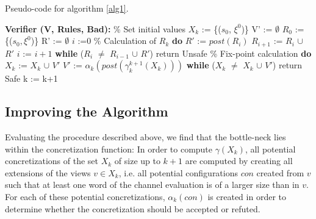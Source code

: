 \begin{algorithm}
  \caption{Pseudo-code for algorithm \ref{alg1}.}
	\label{naive}
  \begin{algorithmic}[1]
    \State \textbf{Verifier (V, Rules, Bad):}
	\State \% Set initial values
	\State $X_k$ := \{($s_0$, $\xi^0$)\}
	\State V' := $\emptyset$
	\State $R_0$ := \{($s_0, \xi^0$)\}
	\State R' := $\emptyset$
	\State $i$ :=$0$
	\State
	\State \% Calculation of $R_k$
	\State \textbf{do}
        \State \hspace{10pt} $R'$ := $post(R_i)$
	\State \hspace{10pt} $R_{i+1}$ := $R_i$ $\cup$ $R'$
	\State \hspace{10pt} $i$ := $i+1$
	\State \textbf{while} ($R_i$ $\neq$ $R_{i-1}$ $\cup$ $R'$)
        \State return Unsafe
        \EndIf 
	\State 
	\State \% Fix-point calculation
	\State \textbf{do}
	\State \hspace{10pt} $X_k$ := $X_k$ $\cup$ $V'$
        \State \hspace{10pt} $V'$ := $\alpha_k(post(\gamma_k^{k+1}(X_k)))$
	\State \hspace{10pt} \textbf{while} ($X_k$ $\neq$ $X_k$ $\cup$ $V'$)
        \State return Safe
        \EndIf
        \State k := k+1
      \EndFor
\end{algorithmic}
\end{algorithm}

\subsection{Improving the Algorithm}
Evaluating the procedure described above, we find that the bottle-neck lies within the concretization function:
 In order to compute $\gamma(X_k)$, all potential concretizations of the set $X_k$ of size up to $k+1$ are computed by creating all extensions of the views $v \in X_k$, i.e. all potential configurations $con$ created from $v$ such that at least one word of the channel evaluation is of a larger size than in $v$. For each of these potential concretizations, $\alpha_k(con)$ is created in order to determine whether the concretization should be accepted or refuted.

